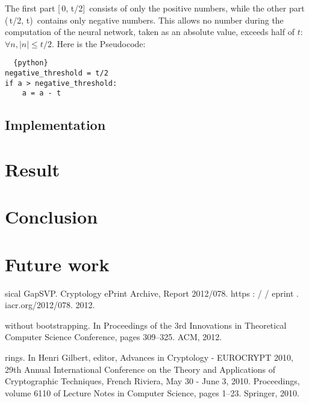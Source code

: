 \documentclass[A4paper,12pt]{article}
\begin{document}
The first part [\,0, t/2]\, consists of only the positive numbers, while the other part (\,t/2, t)\, contains only negative numbers. This allows no number during the computation of the neural network, taken as an absolute value, exceeds half of $t$: $\forall n, |n| \leq t/2$. Here is the Pseudocode:\\
\begin{lstlisting}	{python}
negative_threshold = t/2
if a > negative_threshold:
	a = a - t
\end{lstlisting}


\subsection{Implementation}

\section{Result}

\section{Conclusion}

\section{Future work}

\newpage
\begin{thebibliography}{99}
	
	
	sical GapSVP. Cryptology ePrint Archive, Report 2012/078. https : / / eprint .
	iacr.org/2012/078. 2012.
	
	
	
	
	
	
	without bootstrapping. In Proceedings of the 3rd Innovations in Theoretical Computer Science Conference,
	pages 309–325. ACM, 2012.
	
	rings. In Henri Gilbert, editor, Advances in Cryptology - EUROCRYPT 2010, 29th Annual International
	Conference on the Theory and Applications of Cryptographic Techniques, French Riviera, May 30 - June
	3, 2010. Proceedings, volume 6110 of Lecture Notes in Computer Science, pages 1–23. Springer, 2010.
	
	
\end{thebibliography}
\end{document}

